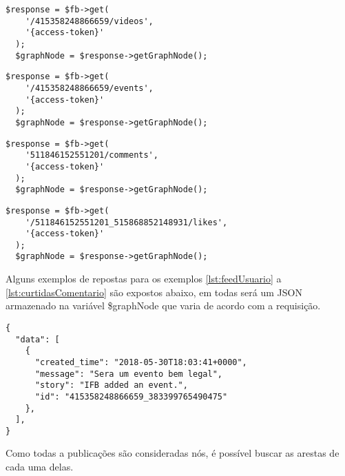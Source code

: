 \begin{lstlisting}[caption={Requisitar os vídeos publicados na página},label={lst:videosPagina}]
  $response = $fb->get( 
    '/415358248866659/videos', 
    '{access-token}'
  );
  $graphNode = $response->getGraphNode();
\end{lstlisting}

\begin{lstlisting}[caption={Requisitar os eventos agendados pela página},label={lst:eventosPagina}]
  $response = $fb->get( 
    '/415358248866659/events', 
    '{access-token}'
  );
  $graphNode = $response->getGraphNode();
\end{lstlisting}

\begin{lstlisting}[caption={Requisitar todos os comentários de uma postagem em uma página},label={lst:comentariosPostagem}]
  $response = $fb->get( 
    '511846152551201/comments', 
    '{access-token}'
  );
  $graphNode = $response->getGraphNode();
\end{lstlisting}

\begin{lstlisting}[caption={Requisitar todas as curtidas de um comentário},label={lst:curtidasComentario}]
  $response = $fb->get( 
    '/511846152551201_515868852148931/likes', 
    '{access-token}'
  );
  $graphNode = $response->getGraphNode();
\end{lstlisting}


Alguns exemplos de repostas para os exemplos \ref{lst:feedUsuario} a \ref{lst:curtidasComentario} são expostos abaixo, em todas será um JSON armazenado na variável \$graphNode que varia de acordo com a requisição.

\begin{lstlisting}[caption={Resposta da requisição \ref{lst:feedUsuario} e \ref{lst:feedPagina}},label={lst:respostas1}]
{
  "data": [
    {
      "created_time": "2018-05-30T18:03:41+0000",
      "message": "Sera um evento bem legal",
      "story": "IFB added an event.",
      "id": "415358248866659_383399765490475"
    },
  ],
}
\end{lstlisting} 








Como todas a publicações são consideradas nós, é possível buscar as arestas de cada uma delas. 







